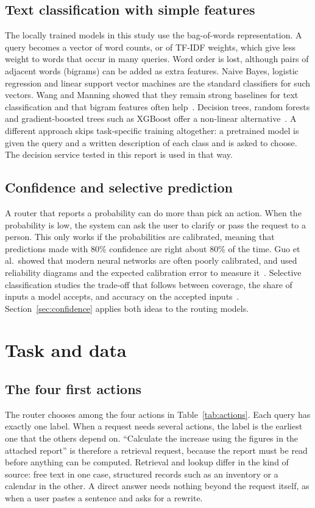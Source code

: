 \documentclass[conference]{IEEEtran}
\begin{document}
\subsection{Text classification with simple features}
The locally trained models in this study use the bag-of-words representation. A query becomes a vector of word counts, or of TF-IDF weights, which give less weight to words that occur in many queries. Word order is lost, although pairs of adjacent words (bigrams) can be added as extra features. Naive Bayes, logistic regression and linear support vector machines are the standard classifiers for such vectors. Wang and Manning showed that they remain strong baselines for text classification and that bigram features often help~\cite{wang-manning}. Decision trees, random forests and gradient-boosted trees such as XGBoost offer a non-linear alternative~\cite{xgboost}. A different approach skips task-specific training altogether: a pretrained model is given the query and a written description of each class and is asked to choose. The decision service tested in this report is used in that way.

\subsection{Confidence and selective prediction}
A router that reports a probability can do more than pick an action. When the probability is low, the system can ask the user to clarify or pass the request to a person. This only works if the probabilities are calibrated, meaning that predictions made with 80\% confidence are right about 80\% of the time. Guo et al.\ showed that modern neural networks are often poorly calibrated, and used reliability diagrams and the expected calibration error to measure it~\cite{guo-calibration}. Selective classification studies the trade-off that follows between coverage, the share of inputs a model accepts, and accuracy on the accepted inputs~\cite{selective}. Section~\ref{sec:confidence} applies both ideas to the routing models.

\section{Task and data}\label{sec:data}

\subsection{The four first actions}
The router chooses among the four actions in Table~\ref{tab:actions}. Each query has exactly one label. When a request needs several actions, the label is the earliest one that the others depend on. ``Calculate the increase using the figures in the attached report'' is therefore a retrieval request, because the report must be read before anything can be computed. Retrieval and lookup differ in the kind of source: free text in one case, structured records such as an inventory or a calendar in the other. A direct answer needs nothing beyond the request itself, as when a user pastes a sentence and asks for a rewrite.
\end{document}
